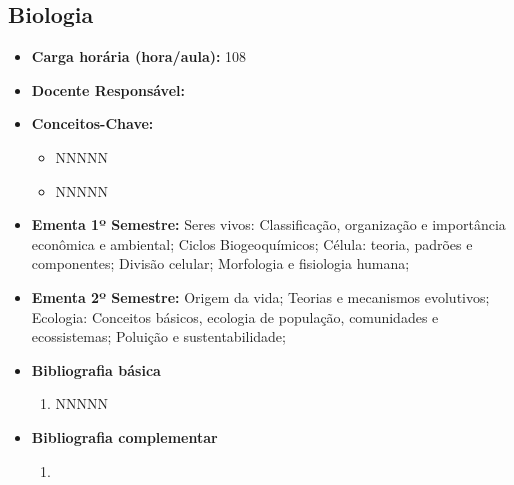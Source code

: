 \documentclass[11pt,fleqn]{book} %
\begin{document}
\subsection{Biologia}\label{disc:biologia}
\begin{itemize}
	\item \textbf{Carga horária (hora/aula):} 108
	\item \textbf{Docente Responsável:}
	\item \textbf{Conceitos-Chave:}
	\begin{itemize}
		\item NNNNN
		\item NNNNN
	\end{itemize}
	\item \textbf{Ementa 1º Semestre:} 
	Seres vivos: Classificação, organização e importância econômica e ambiental;
	Ciclos Biogeoquímicos; 
	Célula: teoria, padrões e componentes; 
	Divisão celular;
	Morfologia e fisiologia humana;
	
	\item \textbf{Ementa 2º Semestre:} 
	Origem da vida; 
	Teorias e mecanismos evolutivos;
	Ecologia: Conceitos básicos, ecologia de população, comunidades e ecossistemas; 
	Poluição e sustentabilidade;
	
	\item \textbf{Bibliografia básica}
	\begin{enumerate}
		\item NNNNN
	\end{enumerate}
	\item \textbf{Bibliografia complementar}
	\begin{enumerate}
		\item 
	\end{enumerate}	
\end{itemize}

\newpage
\end{document}

